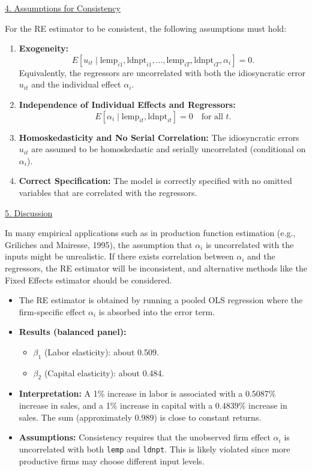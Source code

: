 \documentclass[a4paper,12pt]{article} %
\theoremstyle{nonitalic}
\newenvironment{solution}[1]
  {\renewcommand\theinnercustomsol{#1}\innercustomsol}
  {\endinnercustomsol}
\newcounter{solutionctr}
\renewcommand{\thesolutionctr}{(\alph{solutionctr})}
\newenvironment{autosolution}
  {\stepcounter{solutionctr}\begin{solution}{\thesolutionctr}}
  {\end{solution}}
\begin{document}
\begin{autosolution}
\underline{4. Assumptions for Consistency}

For the RE estimator to be consistent, the following assumptions must hold:
\begin{enumerate}
    \item \textbf{Exogeneity:} 
    \[
    E\left[u_{it} \mid \text{lemp}_{i1}, \text{ldnpt}_{i1}, \dots, \text{lemp}_{iT}, \text{ldnpt}_{iT}, \alpha_i\right] = 0.
    \]
    Equivalently, the regressors are uncorrelated with both the idiosyncratic error $u_{it}$ and the individual effect $\alpha_i$.
    
    \item \textbf{Independence of Individual Effects and Regressors:}
    \[
    E\left[\alpha_i \mid \text{lemp}_{it}, \text{ldnpt}_{it}\right] = 0 \quad \text{for all } t.
    \]
    
    \item \textbf{Homoskedasticity and No Serial Correlation:}  
    The idiosyncratic errors $u_{it}$ are assumed to be homoskedastic and serially uncorrelated (conditional on $\alpha_i$).
    
    \item \textbf{Correct Specification:}  
    The model is correctly specified with no omitted variables that are correlated with the regressors.
\end{enumerate}

\underline{5. Discussion}

In many empirical applications such as in production function estimation (e.g., Griliches and Mairesse, 1995), the assumption that $\alpha_i$ is uncorrelated with the inputs might be unrealistic. If there exists correlation between $\alpha_i$ and the regressors, the RE estimator will be inconsistent, and alternative methods like the Fixed Effects estimator should be considered.

\begin{itemize}
    \item The RE estimator is obtained by running a pooled OLS regression where the firm-specific effect $\alpha_i$ is absorbed into the error term.
    \item \textbf{Results (balanced panel):}
    
    \begin{itemize}
        \item $\beta_1$ (Labor elasticity): about 0.509.
        \item $\beta_2$ (Capital elasticity): about 0.484.
    \end{itemize}
    \item \textbf{Interpretation:} A 1\% increase in labor is associated with a $0.5087\%$ increase in sales, and a 1\% increase in capital with a $0.4839\%$ increase in sales. The sum (approximately 0.989) is close to constant returns.
    \item \textbf{Assumptions:} Consistency requires that the unobserved firm effect $\alpha_i$ is uncorrelated with both \texttt{lemp} and \texttt{ldnpt}. This is likely violated since more productive firms may choose different input levels.
\end{itemize}


\end{autosolution}
\end{document}
